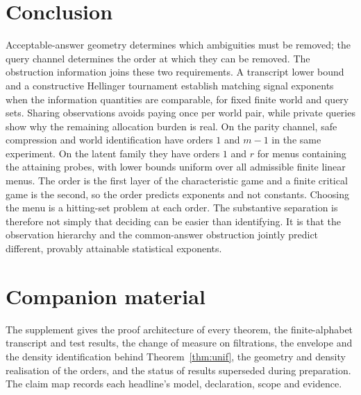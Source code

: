\section{Conclusion}

Acceptable-answer geometry determines which ambiguities must be removed; the query channel
determines the order at which they can be removed. The obstruction information joins these
two requirements. A transcript lower bound and a constructive Hellinger tournament establish
matching signal exponents when the information quantities are comparable, for fixed finite
world and query sets. Sharing observations avoids paying once per world pair, while private
queries show why the remaining allocation burden is real.
On the parity channel, safe compression and world identification have orders $1$ and $m-1$
in the same experiment. On the latent family they have orders $1$ and $r$ for menus containing
the attaining probes, with lower bounds uniform over all admissible finite linear menus.
The order is the first layer of the characteristic game and a finite critical game is the
second, so the order predicts exponents and not constants. Choosing the menu is a hitting-set
problem at each order.
The substantive separation is therefore not simply that deciding can be easier than
identifying. It is that the observation hierarchy and the common-answer obstruction jointly
predict different, provably attainable statistical exponents.

\section*{Companion material}
The supplement gives the proof architecture of every theorem, the finite-alphabet transcript and
test results, the change of measure on filtrations, the envelope and the density identification
behind Theorem~\ref{thm:unif}, the geometry and density realisation of the orders, and the status
of results superseded during preparation. The claim map records each headline's model,
declaration, scope and evidence.

